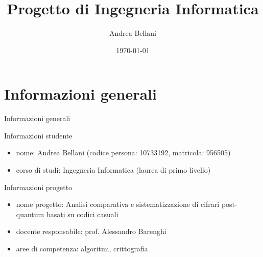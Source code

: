 \documentclass[10pt]{beamer}
\begin{document}
	
	\title{Progetto di Ingegneria Informatica}
	\author{Andrea Bellani}
	\date{\today}
	
	\begin{frame}
		\titlepage
	\end{frame}
	
	\section{Informazioni generali}
		\begin{frame}{Informazioni generali}
			\begin{block}{Informazioni studente}
				\begin{itemize}
					\item nome: Andrea Bellani (codice persona: 10733192, matricola: 956505)
					\item corso di studi: Ingegneria Informatica (laurea di primo livello)
				\end{itemize}
			\end{block}
			\begin{block}{Informazioni progetto}
				\begin{itemize}
					\item nome progetto: Analisi comparativa e sistematizzazione di cifrari post-quantum basati su codici casuali
					\item docente responsabile: prof. Alessandro Barenghi
					\item aree di competenza: algoritmi, crittografia
				\end{itemize}
			\end{block}
		\end{frame}
\end{document}
